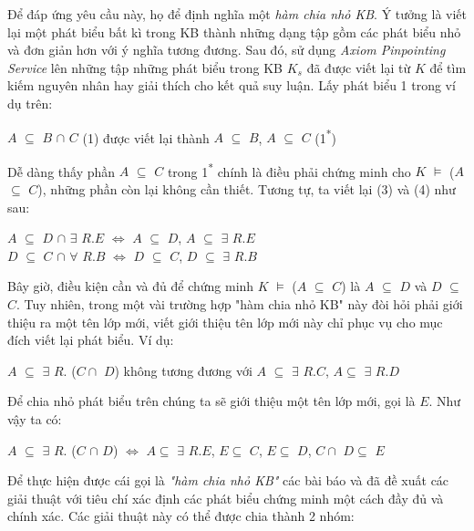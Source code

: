 \hspace*{0.05\textwidth} Để đáp ứng yêu cầu này, họ để định nghĩa một \textit{hàm chia nhỏ KB}. Ý tưởng là viết lại một phát biểu bất kì trong KB thành những dạng tập gồm các phát biểu nhỏ và đơn giản hơn với ý nghĩa  tương đương. Sau đó, sử dụng \textit{Axiom Pinpointing Service} lên những tập những phát biểu trong KB $K_{s}$ đã được viết lại từ $K$ để tìm kiếm nguyên nhân hay giải thích cho kết quả suy luận. Lấy phát biểu 1 trong ví dụ trên:
\begin{center}
	$A$ $\subseteq$ $B$ $\cap$ $C$ (1) được viết lại thành $A$ $\subseteq$ $B$, $A$ $\subseteq$ $C$ (1\textsuperscript{*})
\end{center}
Dễ dàng thấy phần $A$ $\subseteq$ $C$ trong 1\textsuperscript{*} chính là điều phải chứng minh cho $K$ $\models$ ($A$ $\subseteq$ $C$), những phần còn lại không cần thiết. Tương tự, ta viết lại (3) và (4) như sau:
\begin{center}
	$A$ $\subseteq$ $D$ $\cap$ $\exists$ $R.E$  $\Leftrightarrow$ $A$ $\subseteq$ $D$, $A$ $\subseteq$ $\exists$ $R.E$
	\\
	$D$ $\subseteq$ $C$ $\cap$ $\forall$ $R.B$ $\Leftrightarrow$ $D$ $\subseteq$ $C$, $D$ $\subseteq$ $\exists$ $R.B$
\end{center}
Bây giờ, điều kiện cần và đủ để chứng minh $K$ $\models$ ($A$ $\subseteq$ $C$) là $A$ $\subseteq$ $D$ và $D$ $\subseteq$ $C$. Tuy nhiên, trong một vài trường hợp "hàm chia nhỏ KB" này đòi hỏi phải giới thiệu ra một tên lớp mới, viết giới thiệu tên lớp mới này chỉ phục vụ cho mục đích viết lại phát biểu. Ví dụ:	
\begin{center}
	$A$ $\subseteq$ $\exists$ $R.$ ($C\cap$ $D$) không tương đương với $A$ $\subseteq$ $\exists$ $R.C$, $A\subseteq$ $\exists$ $R.D$
\end{center}
Để chia nhỏ phát biểu trên chúng ta sẽ giới thiệu một tên lớp mới, gọi là $E$.	Như vậy ta có:
\begin{center}
	$A$ $\subseteq$ $\exists$ $R.$ ($C$ $\cap$ $D$) $\Leftrightarrow$ $A\subseteq$ $\exists$ $R.E$, $E\subseteq$ $C$, $E\subseteq$ $D$, $C\cap$ $D\subseteq$ $E$
\end{center}
Để thực hiện được cái gọi là \textit{"hàm chia nhỏ KB"} các bài báo \cite{repair} và \cite{axiomPinpoint} đã đề xuất các giải thuật với tiêu chí xác định các phát biểu chứng minh một cách đầy đủ và chính xác. Các giải thuật này có thể được chia thành 2 nhóm:
